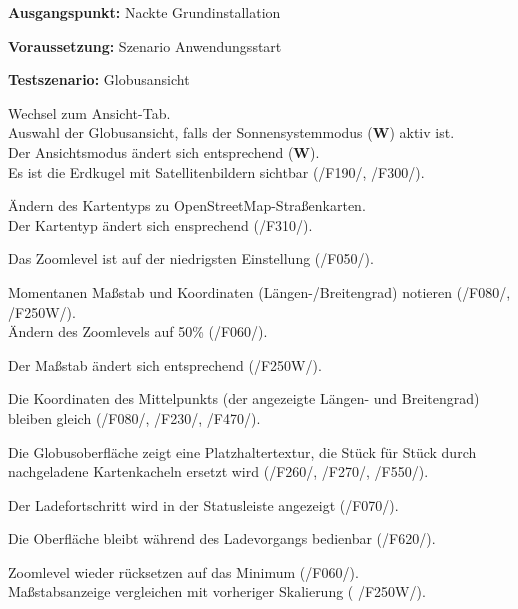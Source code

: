 \documentclass[10pt]{scrreprt}
\newcommand{\sfbf}[1]{\textbf{\sffamily #1}}
\newcommand{\W}{\sfbf{W}}
\newcommand{\ziel}[1]{{\fontsize{9.5}{11}\textsf{/#1/}}}
\newenvironment{details}[1][6pt]{%
  \parskip#1 \parindent6mm \raggedright%
  \def\item{\par\ignorespaces\hangindent=5mm \hangafter1}}{%
  \par\ignorespaces}
\begin{document}
\newpage
\vspace{1.0cm}
\begin{details}[2pt]
\item \sfbf{Ausgangspunkt:} Nackte Grundinstallation 
\item \sfbf{Voraussetzung:} Szenario Anwendungsstart
\item \sfbf{Testszenario:} Globusansicht
\end{details}
\vspace{2mm}
\begin{enumerate}[leftmargin = 2.2cm, resume]
\item Wechsel zum Ansicht-Tab.\\
Auswahl der Globusansicht, falls der Sonnensystemmodus (\W) aktiv ist.\\Der Ansichtsmodus ändert sich entsprechend (\W).\\
Es ist die Erdkugel mit Satellitenbildern sichtbar (\ziel{F190}, \ziel{F300}).
\item Ändern des Kartentyps zu OpenStreetMap-Straßenkarten.\\Der Kartentyp ändert sich ensprechend (\ziel{F310}).
\item Das Zoomlevel ist auf der niedrigsten Einstellung (\ziel{F050}).
\item Momentanen Maßstab und Koordinaten (Längen-/Breitengrad) notieren (\ziel{F080}, \ziel{F250W}).\\Ändern des Zoomlevels auf 50\% (\ziel{F060}).\item Der Maßstab ändert sich entsprechend (\ziel{F250W}).
\item Die Koordinaten des Mittelpunkts (der angezeigte Längen- und Breitengrad) bleiben gleich (\ziel{F080}, \ziel{F230}, \ziel{F470}).
\item Die Globusoberfläche zeigt eine Platzhaltertextur, die Stück für Stück durch nachgeladene Kartenkacheln ersetzt wird (\ziel{F260}, \ziel{F270}, \ziel{F550}).
\item Der Ladefortschritt wird in der Statusleiste angezeigt (\ziel{F070}). \item Die Oberfläche bleibt während des Ladevorgangs bedienbar (\ziel{F620}).
\item Zoomlevel wieder rücksetzen auf das Minimum (\ziel{F060}).\\ Maßstabsanzeige vergleichen mit vorheriger Skalierung ( \ziel{F250W}).
\end{enumerate}
\end{document}
